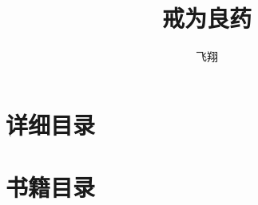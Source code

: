 \documentclass{ctexart}
\title{戒为良药}
\author{飞翔}
\date{}
\begin{document}
\maketitle
\begin{multicols}{2}
\end{multicols}\clearpage

% 

% 
% 
% 
% 
% 
% 
% 
% 
% 
% 
% 
% 
% 
% 
% 
% 
% 
% 
% 
% 
% 
% 
% 
% 
% 
% 
% 
% 
% 
% 
% 
% 


\clearpage\appendix

\section{详细目录}

\setcounter{tocdepth}{4}
\renewcommand*{\contentsname}{}
\begin{multicols}{2}
    \tableofcontents
\end{multicols}

\section{书籍目录}
\renewcommand*{\listtheoremname}{}
\begin{multicols}{2}
    \listoftheorems[ignoreall, show = book]
\end{multicols}
\end{document}
